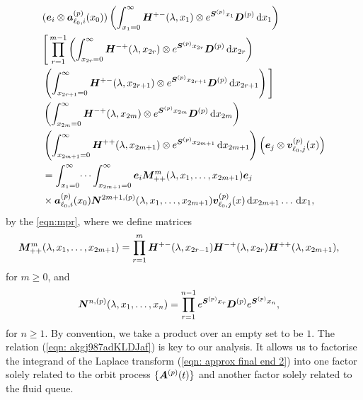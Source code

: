 \begin{align}
	&(\bs e_i \otimes \bs   a_{\ell_0,i}^{(p)}(x_0)) \left( \int_{x_1=0}^\infty \bs H^{+-}(\lambda,x_1)\otimes e^{\bs{S}^{(p)}x_1}\bs{D}^{(p)}\wrt x_1 \right)\nonumber%
	\\&\Bigg[\prod_{r=1}^{m-1} \left(\int_{x_{2r}=0}^\infty \bs H^{-+}(\lambda,x_{2r}) \otimes e^{\bs{S}^{(p)}x_{2r}}\bs{D}^{(p)}\wrt x_{2r}\right) \nonumber 
	\\&\nonumber \left(\int_{x_{2r+1}=0}^\infty \bs H^{+-}(\lambda,x_{2r+1})
	\otimes e^{\bs{S}^{(p)}x_{2r+1}}\bs{D}^{(p)} \wrt x_{2r+1} \right)\Bigg] 
	\\&\left(\int_{x_{2m}=0}^\infty \bs H^{-+}(\lambda,x_{2m})
	  \otimes e^{\bs{S}^{(p)}x_{2m}}\bs{D}^{(p)} \wrt x_{2m} \right) \nonumber 
	\\&\left(\int_{x_{2m+1}=0}^\infty \bs H^{++}(\lambda,x_{2m+1})\otimes 
	e^{\bs{S}^{(p)}x_{2m+1}} \wrt x_{2m+1}\right) \left(\bs e_j \otimes {\bs v}_{\ell_0,j}^{(p)}(x)\right) \nonumber
	\\&=\int_{x_1=0}^\infty \dots \int_{x_{2m+1}=0}^\infty \bs e_i\bs M^{m}_{++}(\lambda,x_1,\dots,x_{2m+1})\bs e_j \nonumber 
	\\&\times \bs a_{\ell_0,i}^{(p)}(x_0) \bs N^{2m+1,(p)}(\lambda,x_1,\dots,x_{2m+1}) {\bs v}_{\ell_0,j}^{(p)}( x)\wrt x_{2m+1}\dots\wrt x_1 ,
	 \label{eqn: approx final end 2}
\end{align}
by the \ref{eqn:mpr}, where we define matrices 
\begin{align}
	&\boldsymbol M^{m}_{++}(\lambda,x_1,\dots,x_{2m+1}) \nonumber 
	= \prod_{r=1}^{m}\boldsymbol H^{+-}(\lambda,x_{2r-1})\boldsymbol H^{-+}(\lambda,x_{2r})  
	\boldsymbol H^{++}(\lambda,x_{2m+1}),\nonumber 
\end{align}
for \(m\geq 0\), and
\begin{align}
	\boldsymbol N^{n,(p)}(\lambda,x_1,\dots,x_{n}) &= \prod_{r=1}^{n-1} e^{\boldsymbol{S}^{(p)}x_{r}}\boldsymbol{D}^{(p)} e^{\boldsymbol{S}^{(p)}x_{n}}, \nonumber 
\end{align}
for \(n\geq 1\). By convention, we take a product over an empty set to be \(1\). The relation (\ref{eqn: akgj987adKLDJaf}) is key to our analysis. It allows us to factorise the integrand of the Laplace transform (\ref{eqn: approx final end 2}) into one factor solely related to the orbit process \(\{\boldsymbol A^{(p)}(t)\}\) and another factor solely related to the fluid queue. 

